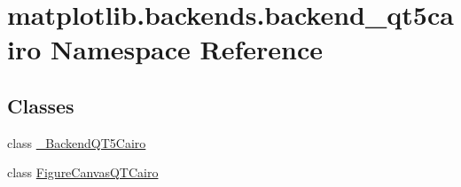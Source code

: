 \hypertarget{namespacematplotlib_1_1backends_1_1backend__qt5cairo}{}\section{matplotlib.\+backends.\+backend\+\_\+qt5cairo Namespace Reference}
\label{namespacematplotlib_1_1backends_1_1backend__qt5cairo}
\subsection*{Classes}
\begin{DoxyCompactItemize}
\item 
class \hyperlink{classmatplotlib_1_1backends_1_1backend__qt5cairo_1_1__BackendQT5Cairo}{\+\_\+\+Backend\+Q\+T5\+Cairo}
\item 
class \hyperlink{classmatplotlib_1_1backends_1_1backend__qt5cairo_1_1FigureCanvasQTCairo}{Figure\+Canvas\+Q\+T\+Cairo}
\end{DoxyCompactItemize}
